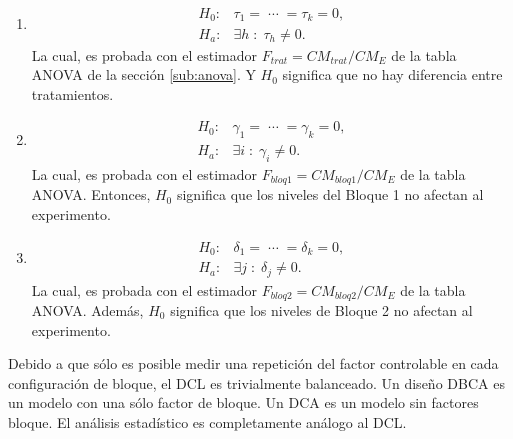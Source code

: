 \documentclass[11pt,a4paper]{article}
\begin{document}
\begin{enumerate}
	\item[\fbox{Hip. Principal}]
		\begin{equation}
			\begin{array}{rl}
				H_0 :& \tau _1 = \;\cdots\; = \tau _k = 0, \\[2mm]
				H_a: &\exists h \;:\; \tau _h \ne 0.
			\end{array}
			\label{eq:hipotesis_principal}
		\end{equation}
		La cual, es probada con el estimador \(F_{trat} = CM_{trat} / CM_E\) de la tabla ANOVA de la sección \ref{sub:anova}.
		Y \(H_0\) significa que no hay diferencia entre tratamientos.
	\item[\fbox{Hip. Secundaria 1}]
		\begin{equation}
			\begin{array}{rl}
				H_0 : & \gamma _1 = \;\cdots\; = \gamma _k =0, \\[2mm]
				H_a : & \exists i \;:\; \gamma _i \ne 0.
			\end{array}
			\label{eq:hipotesis_sec_1}
		\end{equation}
		La cual, es probada con el estimador \(F_{bloq1} = CM_{bloq1} / CM_E\) de la tabla ANOVA.
		Entonces, \(H_0\) significa que los niveles del Bloque 1 no afectan al experimento.
	\item[\fbox{Hip. Secundaria 2}]
		\begin{equation}
			\begin{array}{rl}
				H_0 : & \delta _1 =  \;\cdots\; = \delta _k = 0, \\[2mm]
				H_a : & \exists j \;:\; \delta _j \ne 0.
			\end{array}
			\label{eq:hipotesis_sec_2}
		\end{equation}
		La cual, es probada con el estimador \(F_{bloq2} = CM_{bloq2} / CM_E\) de la tabla ANOVA.
		Además, \(H_0\) significa que los niveles de Bloque 2 no afectan al experimento.
\end{enumerate}
Debido a que sólo es posible medir una repetición del factor controlable en cada configuración de bloque, el DCL es trivialmente balanceado.
Un diseño DBCA es un modelo con una sólo factor de bloque. Un DCA es un modelo sin factores bloque. El análisis estadístico es completamente análogo al DCL.



\newpage
\end{document}
